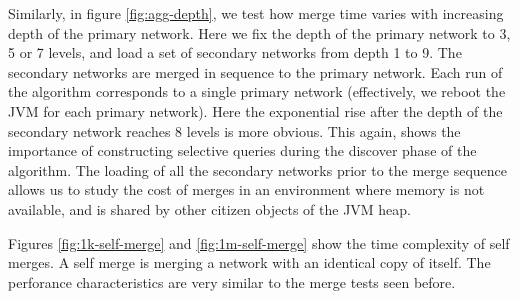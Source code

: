 Similarly, in figure \ref{fig:agg-depth}, we test how merge time varies with increasing depth of the primary network. Here we fix the depth of the primary network to 3, 5 or 7 levels, and load a set of secondary networks from depth 1 to 9. The secondary networks are merged in sequence to the primary network. Each run of the algorithm corresponds to a single primary network (effectively, we reboot the JVM for each primary network). Here the exponential rise after the depth of the secondary network reaches 8 levels is more obvious. This again, shows the importance of constructing selective queries during the discover phase of the algorithm. The loading of all the secondary networks prior to the merge sequence allows us to study the cost of merges in an environment where  memory is not available, and is shared by other citizen objects of the JVM heap. 

Figures \ref{fig:1k-self-merge} and \ref{fig:1m-self-merge} show the time complexity of self merges. A self merge is merging a network with an identical copy of itself. The perforance characteristics are very similar to the merge tests seen before.

